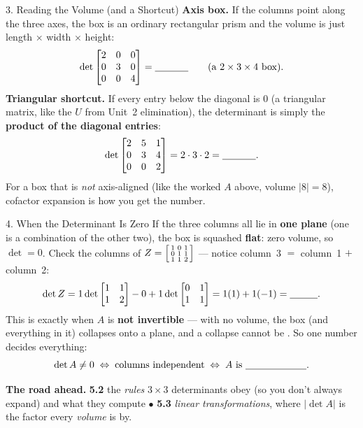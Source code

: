 \documentclass[10pt]{article}
\begin{document}
\begin{notesbox}{3. Reading the Volume (and a Shortcut)}
\textbf{Axis box.} If the columns point along the three axes, the box is an ordinary rectangular
prism and the volume is just length $\times$ width $\times$ height:
\[
  \det\begin{bmatrix} 2 & 0 & 0 \\ 0 & 3 & 0 \\ 0 & 0 & 4 \end{bmatrix} = \blank{1.2cm}
  \qquad(\text{a } 2\times3\times4 \text{ box}).
\]
\textbf{Triangular shortcut.} If every entry below the diagonal is $0$ (a triangular matrix, like the
$U$ from Unit~2 elimination), the determinant is simply the \textbf{product of the diagonal entries}:
\[
  \det\begin{bmatrix} 2 & 5 & 1 \\ 0 & 3 & 4 \\ 0 & 0 & 2 \end{bmatrix}
  = 2\cdot 3\cdot 2 = \blank{1.2cm}.
\]
For a box that is \emph{not} axis-aligned (like the worked $A$ above, volume $|8|=8$), cofactor
expansion is how you get the number.
\end{notesbox}

\begin{notesbox}{4. When the Determinant Is Zero}
If the three columns all lie in \textbf{one plane} (one is a combination of the other two), the box is
squashed \textbf{flat}: zero volume, so $\det=0$. Check the columns of
$Z=\begin{bsmallmatrix} 1 & 0 & 1 \\ 0 & 1 & 1 \\ 1 & 1 & 2 \end{bsmallmatrix}$ --- notice column~3
$=$ column~1 $+$ column~2:
\[
  \det Z = 1\det\begin{bmatrix} 1 & 1 \\ 1 & 2 \end{bmatrix}
         - 0
         + 1\det\begin{bmatrix} 0 & 1 \\ 1 & 1 \end{bmatrix}
         = 1(1) + 1(-1) = \blank{1.0cm}.
\]
This is exactly when $A$ is \textbf{not invertible} --- with no volume, the box (and everything in it)
collapses onto a plane, and a collapse cannot be \blank{2.2cm}. So one number decides everything:
\[
  \det A \ne 0 \;\Leftrightarrow\; \text{columns independent} \;\Leftrightarrow\; A \text{ is }\blank{2.2cm}.
\]

\vspace{2pt}
\textbf{The road ahead.} \textbf{5.2} the \emph{rules} $3\times3$ determinants obey (so you don't
always expand) and what they compute\; $\bullet$\; \textbf{5.3} \emph{linear transformations}, where
$|\det A|$ is the factor every \emph{volume} is \blank{2.2cm} by.
\end{notesbox}
\end{document}
